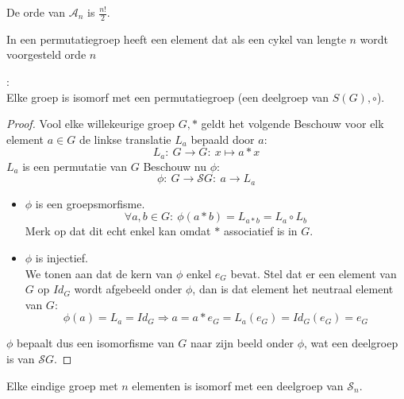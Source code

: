 \documentclass[main.tex]{subfiles}
\begin{document}
\begin{st}
  De orde van $\mathcal{A}_{n}$ is $\frac{n!}{2}$.

\end{st}

\begin{st}
  \label{st:r-cykel-orde-r}
  In een permutatiegroep heeft een element dat als een cykel van lengte $n$ wordt voorgesteld orde $n$

\end{st}

\begin{st}
  \examen
  \label{st:stelling-van-cayley}
  :\\
  Elke groep is isomorf met een permutatiegroep (een deelgroep van $S(G),\circ$).

  \begin{proof}
    Vool elke willekeurige groep $G,*$ geldt het volgende
    Beschouw voor elk element $a\in G$ de linkse translatie $L_{a}$ bepaald door $a$:
    \[ L_{a}:\ G \rightarrow G:\ x \mapsto a * x \]
    $L_{a}$ is een permutatie van $G$ 
    Beschouw nu $\phi$:
    \[ \phi:\ G \rightarrow \mathcal{S}G:\ a \rightarrow L_{a} \] 
    \begin{itemize}
    \item $\phi$ is een groepsmorfisme.\\
      \[ \forall a,b \in G:\ \phi(a*b) = L_{a*b} = L_{a}\circ L_{b} \]
      Merk op dat dit echt enkel kan omdat $*$ associatief is in $G$.
    \item $\phi$ is injectief.\\
      We tonen aan dat de kern van $\phi$ enkel $e_{G}$ bevat.
      Stel dat er een element van $G$ op $Id_{G}$ wordt afgebeeld onder $\phi$, dan is dat element het neutraal element van $G$:
      \[ \phi(a) = L_{a} = Id_{G} \Rightarrow a = a * e_{G} = L_{a}(e_{G}) = Id_{G}(e_{G}) = e_{G} \]
    \end{itemize}
    $\phi$ bepaalt dus een isomorfisme van $G$ naar zijn beeld onder $\phi$, wat een deelgroep is van $\mathcal{S}G$.
  \end{proof}
\end{st}

\begin{gev}
  Elke eindige groep met $n$ elementen is isomorf met een deelgroep van $\mathcal{S}_{n}$.
\end{gev}
\end{document}
